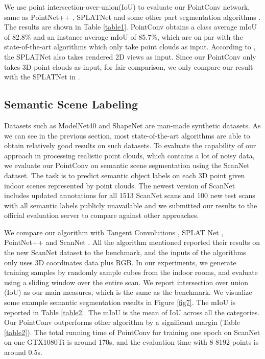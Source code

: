 \documentclass[10pt,twocolumn,letterpaper]{article}
\begin{document}
We use point intersection-over-union(IoU) to evaluate our PointConv network, same as PointNet++ \cite{qi2017pointnet++}, SPLATNet \cite{su2018splatnet} and some other part segmentation algorithms \cite{yi2017syncspeccnn, klokov2017escape,xu2018spidercnn, graham2017submanifold}. The results are shown in Table \ref{table1}. PointConv obtains a class average mIoU of 82.8\% and an instance average mIoU of 85.7\%, which are on par with the state-of-the-art algorithms which only take point clouds as input. According to \cite{su2018splatnet}, the SPLATNet also takes rendered 2D views as input. Since our PointConv only takes 3D point clouds as input, for fair comparison, we only compare our result with the SPLATNet in \cite{su2018splatnet}.

\subsection{Semantic Scene Labeling}

Datasets such as ModelNet40 \cite{wu20153d} and ShapeNet \cite{chang2015shapenet} are man-made synthetic datasets. As we can see in the previous section, most state-of-the-art algorithms are able to obtain relatively good results on such datasets. To evaluate the capability of our approach in processing realistic point clouds, which contains a lot of noisy data, we evaluate our PointConv on semantic scene segmentation using the ScanNet dataset. The task is to predict semantic object labels on each 3D point given indoor scenes represented by point clouds. The newest version of ScanNet \cite{dai2017scannet} includes updated annotations for all 1513 ScanNet scans and 100 new test scans with all semantic labels publicly unavailable and we submitted our results to the official evaluation server to compare against other approaches. 

We compare our algorithm with Tangent Convolutions \cite{tatarchenko2018tangent}, SPLAT Net \cite{su2018splatnet}, PointNet++ \cite{qi2017pointnet++} and ScanNet \cite{dai2017scannet}. All the algorithm mentioned reported their results on the new ScanNet dataset to the benchmark, and the inputs of the algorithms only uses 3D coordinates data plus RGB. In our experiments, we generate training samples by randomly sample  cubes from the indoor rooms, and evaluate using a sliding window over the entire scan. We report intersection over union (IoU) as our main measures, which is the same as the benchmark. We visualize some example semantic segmentation results in Figure \ref{fig7}. The mIoU is reported in Table \ref{table2}. The mIoU is the mean of IoU across all the categories. Our PointConv outperforms other algorithm by a significant margin (Table \ref{table2}). The total running time of PointConv for training one epoch on ScanNet on one GTX1080Ti is around 170s, and the evaluation time with 8  8192 points is around 0.5s.
\end{document}
